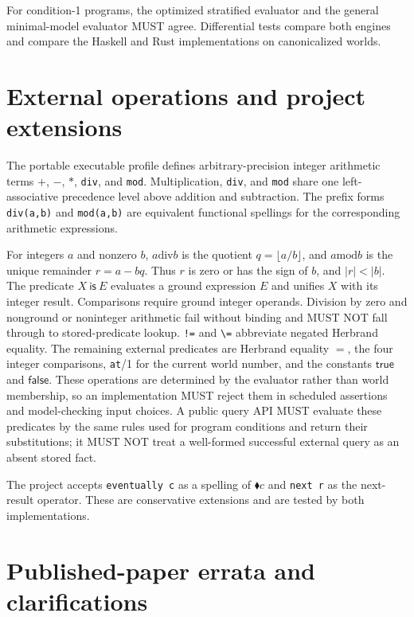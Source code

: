 \documentclass[11pt]{article}
\newcommand{\once}{\mathbin{\blacklozenge}}
\newcommand{\true}{\mathsf{true}}
\newcommand{\false}{\mathsf{false}}
\begin{document}
For condition-1 programs, the optimized stratified evaluator and the general
minimal-model evaluator MUST agree.  Differential tests compare both engines
and compare the Haskell and Rust implementations on canonicalized worlds.

\section{External operations and project extensions}

The portable executable profile defines arbitrary-precision integer arithmetic
terms $+$, $-$, $*$, \verb|div|, and \verb|mod|.  Multiplication,
\verb|div|, and \verb|mod| share one left-associative precedence level above
addition and subtraction.  The prefix forms \verb|div(a,b)| and
\verb|mod(a,b)| are equivalent functional spellings for the corresponding
arithmetic expressions.

For integers $a$ and nonzero $b$, $a\mathbin{\mathrm{div}}b$ is the quotient
$q=\lfloor a/b\rfloor$, and $a\mathbin{\mathrm{mod}}b$ is the unique remainder
$r=a-bq$.  Thus $r$ is zero or has the sign of $b$, and $|r|<|b|$.
The predicate $X\ \mathsf{is}\ E$ evaluates a ground expression $E$ and
unifies $X$ with its integer result.  Comparisons require ground integer
operands.  Division by zero and nonground or noninteger arithmetic fail
without binding and MUST NOT fall through to stored-predicate lookup.
\verb|!=| and \verb|\=| abbreviate negated Herbrand equality.
The remaining external predicates are Herbrand equality $=$, the four integer
comparisons, \verb|at|/1 for the current world number, and the constants
$\true$ and $\false$.  These operations are determined by the evaluator rather
than world membership, so an implementation MUST reject them in scheduled
assertions and model-checking input choices.  A public query API MUST evaluate
these predicates by the same rules used for program conditions and return
their substitutions; it MUST NOT treat a well-formed successful external query
as an absent stored fact.

The project accepts \verb|eventually c| as a spelling of $\once c$ and
\verb|next r| as the next-result operator.  These are conservative extensions
and are tested by both implementations.

\section{Published-paper errata and clarifications}\label{sec:errata}
\end{document}
